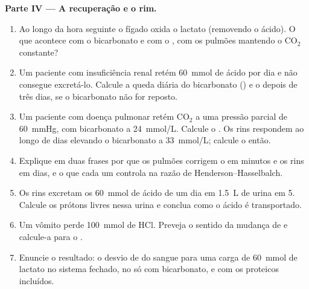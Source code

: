 \begin{problem}
\medskip
\noindent\textbf{Parte IV --- A recuperação e o rim.}
\begin{enumerate}[resume]
  \item Ao longo da hora seguinte o fígado oxida o lactato (removendo o
        ácido). O que acontece com o bicarbonato e com o , com os
        pulmões mantendo o $\mathrm{CO_2}$ constante?
  \item Um paciente com insuficiência renal retém \qty{60}{mmol} de
        ácido por dia e não consegue excretá-lo. Calcule a queda diária
        do bicarbonato () e o  depois de três dias, se o
        bicarbonato não for reposto.
  \item Um paciente com doença pulmonar retém $\mathrm{CO_2}$ a uma
        pressão parcial de \qty{60}{mmHg}, com bicarbonato a
        \qty{24}{mmol/L}. Calcule o . Os rins respondem ao longo de
        dias elevando o bicarbonato a \qty{33}{mmol/L}; calcule o 
        então.
  \item Explique em duas frases por que os pulmões corrigem o  em
        minutos e os rins em dias, e o que cada um controla na razão de
        Henderson--Hasselbalch.
  \item Os rins excretam os \qty{60}{mmol} de ácido de um dia em
        \qty{1.5}{L} de urina em  5. Calcule os prótons livres nessa
        urina e conclua como o ácido é transportado.
  \item Um vômito perde \qty{100}{mmol} de HCl. Preveja o sentido da
        mudança de  e calcule-a para o .
  \item Enuncie o resultado: o desvio de  do sangue para uma carga de
        \qty{60}{mmol} de lactato no sistema fechado, no 
        só com bicarbonato, e com os  proteicos incluídos.
\end{enumerate}
\end{problem}
